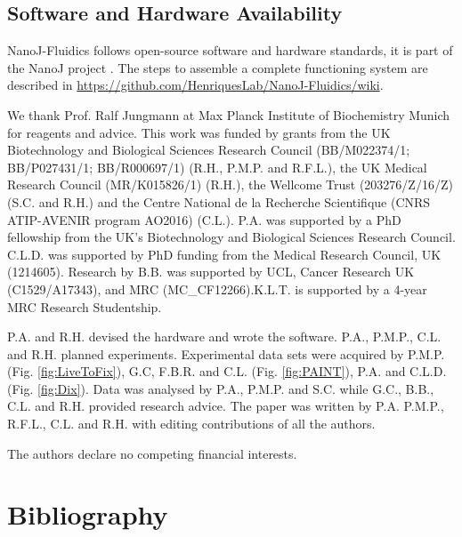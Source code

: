 \subsection*{Software and Hardware Availability}
NanoJ-Fluidics follows open-source software and hardware standards, it is part of the NanoJ project \cite{gustafsson2016fast, culley2018quantitative,gray2016virus}. The steps to assemble a complete functioning system are described in \href{https://github.com/HenriquesLab/NanoJ-Fluidics/wiki}{https://github.com/HenriquesLab/NanoJ-Fluidics/wiki}. 

\begin{acknowledgements}
    We thank Prof. Ralf Jungmann at Max Planck Institute of Biochemistry Munich for reagents and advice. This work was funded by grants from the UK Biotechnology and Biological Sciences Research Council (BB/M022374/1; BB/P027431/1; BB/R000697/1) (R.H., P.M.P. and R.F.L.), the UK Medical Research Council (MR/K015826/1) (R.H.), the Wellcome Trust (203276/Z/16/Z) (S.C. and R.H.) and the Centre National de la Recherche Scientifique (CNRS ATIP-AVENIR program AO2016) (C.L.). P.A. was supported by a PhD fellowship from the UK’s Biotechnology and Biological Sciences Research Council. C.L.D. was supported by PhD funding from the Medical Research Council, UK (1214605). Research by B.B. was supported by UCL, Cancer Research UK (C1529/A17343), and MRC (MC\_CF12266).K.L.T. is supported
    by a 4-year MRC Research Studentship.
\end{acknowledgements}


\begin{contributions}
    P.A. and R.H. devised the hardware and wrote the software. P.A., P.M.P., C.L. and R.H. planned experiments. Experimental data sets were acquired by P.M.P. (Fig. \ref{fig:LiveToFix}), G.C, F.B.R. and C.L. (Fig. \ref{fig:PAINT}), P.A. and C.L.D. (Fig. \ref{fig:Dix}). Data was analysed by P.A., P.M.P. and S.C. while G.C., B.B., C.L. and R.H. provided research advice. The paper was written by P.A. P.M.P., R.F.L., C.L. and R.H. with editing contributions of all the authors.
\end{contributions}

\begin{interests}
    The authors declare no competing financial interests.
\end{interests}

\section*{Bibliography}


